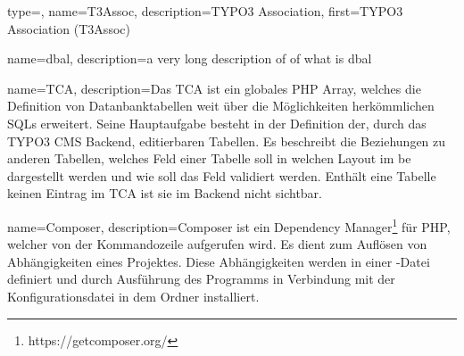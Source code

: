 

{
	type=\acronymtype,
	name={T3Assoc},
	description={TYPO3 Association},
	first={TYPO3 Association (T3Assoc)}
}

{
	name={dbal},
	description={a very long description of of what is dbal}
}

{
	name={TCA},
	description={Das TCA ist ein globales PHP Array, welches die Definition von Datanbanktabellen weit über die Möglichkeiten herkömmlichen SQLs erweitert. Seine Hauptaufgabe besteht in der Definition der, durch das TYPO3 CMS Backend, editierbaren Tabellen. Es beschreibt die Beziehungen zu anderen Tabellen, welches Feld einer Tabelle soll in welchen Layout im \gls{be} dargestellt werden und wie soll das Feld validiert werden. Enthält eine Tabelle keinen Eintrag im TCA ist sie im Backend nicht sichtbar.}
}

{
	name={Composer},
	description={Composer ist ein Dependency Manager\footnote{https://getcomposer.org/} für PHP, welcher von der Kommandozeile aufgerufen wird. Es dient zum Auflösen von Abhängigkeiten eines Projektes. Diese Abhängigkeiten werden in einer -Datei definiert und durch Ausführung des Programms in Verbindung mit der Konfigurationsdatei in dem Ordner  installiert.}
}
